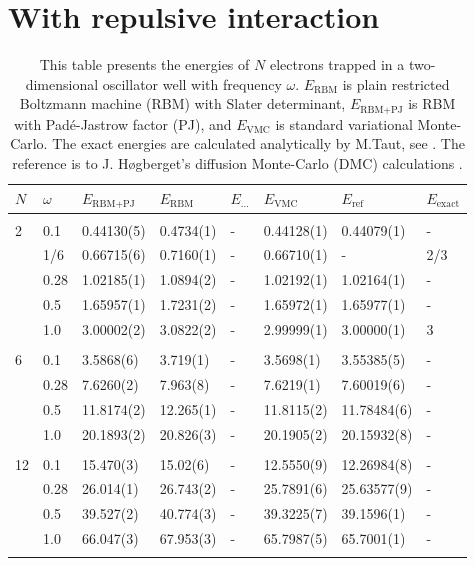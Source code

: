 \section{With repulsive interaction}
\begin{table} [H]
	\caption{This table presents the energies of $N$ electrons trapped in a two-dimensional oscillator well with frequency $\omega$. $E_{\text{RBM}}$ is plain restricted Boltzmann machine (RBM) with Slater determinant, $E_{\text{RBM+PJ}}$ is RBM with Padé-Jastrow factor (PJ), and $E_{\text{VMC}}$ is standard variational Monte-Carlo. The exact energies are calculated analytically by M.Taut, see \cite{taut_two_1994}. The reference is to J. Høgberget's diffusion Monte-Carlo (DMC) calculations \cite{hogberget_quantum_2013}.} 
	\begin{tabularx}{\textwidth}{l:l|XXXXXX} \hline\hline
		\label{tab:quantumdotswinteraction2D}
		$N$ & $\omega$ & $E_{\text{RBM+PJ}}$ & $E_{\text{RBM}}$ & $E_{\text{...}}$ & $E_{\text{VMC}}$ & $E_{\text{ref}} $ & $E_{\text{exact}}$ \\ \hline \\
		2 & 0.1 & 0.44130(5) & 0.4734(1) & - & 0.44128(1) & 0.44079(1) & - \\ 
		& 1/6 & 0.66715(6) & 0.7160(1) & - & 0.66710(1) & - & 2/3 \\
		& 0.28 & 1.02185(1) & 1.0894(2) & - & 1.02192(1) & 1.02164(1) & - \\
		& 0.5 & 1.65957(1) & 1.7231(2) & - & 1.65972(1) & 1.65977(1)  & - \\
		& 1.0 & 3.00002(2) & 3.0822(2) & - & 2.99999(1) & 3.00000(1) & 3  \\ \hdashline \\

		6 & 0.1 & 3.5868(6) & 3.719(1) & - & 3.5698(1) & 3.55385(5) & - \\ 
		& 0.28 & 7.6260(2) & 7.963(8) & - & 7.6219(1) & 7.60019(6) & - \\
		& 0.5 & 11.8174(2) & 12.265(1) & - & 11.8115(2) & 11.78484(6) & - \\
		& 1.0 & 20.1893(2) & 20.826(3) & - & 20.1905(2) & 20.15932(8) & - \\ \hdashline \\
		
		12 & 0.1 & 15.470(3) & 15.02(6) & - & 12.5550(9) & 12.26984(8) & -\\ 
		& 0.28 & 26.014(1) & 26.743(2) & - & 25.7891(6) & 25.63577(9) & -\\
		& 0.5 & 39.527(2) & 40.774(3) & - & 39.3225(7) & 39.1596(1) & - \\
		& 1.0 & 66.047(3) & 67.953(3) & - & 65.7987(5) & 65.7001(1) & - \\ \hdashline \\
		

\end{tabularx}
\end{table}
